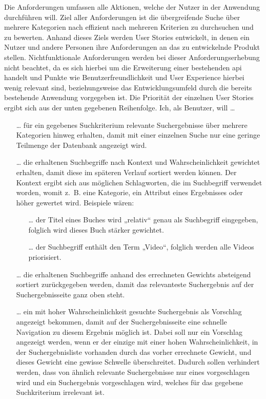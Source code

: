 Die Anforderungen umfassen alle Aktionen, welche der Nutzer in der Anwendung durchführen will. Ziel aller Anforderungen ist die übergreifende Suche über mehrere Kategorien nach effizient nach mehreren Kriterien zu durchsuchen und zu bewerten. Anhand dieses Ziels werden User Stories entwickelt, in denen ein Nutzer und andere Personen ihre Anforderungen an das zu entwickelnde Produkt stellen.
Nichtfunktionale Anforderungen werden bei dieser Anforderungserhebung nicht beachtet, da es sich hierbei um die Erweiterung einer bestehenden \gls{api} handelt und Punkte wie Benutzerfreundlichkeit und User Experience hierbei wenig relevant sind, beziehungsweise das Entwicklungsumfeld durch die bereits bestehende Anwendung vorgegeben ist.
Die Priorität der einzelnen User Stories ergibt sich aus der unten gegebenen Reihenfolge.
Ich, als Benutzer, will …
\begin{itemize}
  \item[…] für ein gegebenes Suchkriterium relevante Suchergebnisse über mehrere Kategorien hinweg erhalten, damit mit einer einzelnen Suche nur eine geringe Teilmenge der Datenbank angezeigt wird.
  \item[…] die erhaltenen Suchbegriffe nach Kontext und Wahrscheinlichkeit gewichtet erhalten, damit diese im späteren Verlauf sortiert werden können. Der Kontext ergibt sich aus möglichen Schlagworten, die im Suchbegriff verwendet worden, womit z. B. eine Kategorie, ein Attribut eines Ergebnisses oder höher gewertet wird. Beispiele wären:
    \begin{itemize}
      \item[…] der Titel eines Buches wird „relativ“ genau als Suchbegriff eingegeben, folglich wird dieses Buch stärker gewichtet.
      \item[…] der Suchbegriff enthält den Term „Video“, folglich werden alle Videos priorisiert.
    \end{itemize}
  \item[…] die erhaltenen Suchbegriffe anhand des errechneten Gewichts absteigend sortiert zurückgegeben werden, damit das relevanteste Suchergebnis auf der Suchergebnisseite ganz oben steht.
  \item[…] ein mit hoher Wahrscheinlichkeit gesuchte Suchergebnis als Vorschlag angezeigt bekommen, damit auf der Suchergebnisseite eine schnelle Navigation zu diesem Ergebnis möglich ist.
    Dabei soll nur ein Vorschlag angezeigt werden, wenn er der einzige mit einer hohen Wahrscheinlichkeit, in der Suchergebnisliste vorhanden durch das vorher errechnete Gewicht, und dieses Gewicht eine gewisse Schwelle überschreitet.
    Dadurch sollen verhindert werden, dass von ähnlich relevante Suchergebnisse nur eines vorgeschlagen wird und ein Suchergebnis vorgeschlagen wird, welches für das gegebene Suchkriterium irrelevant ist.
\end{itemize}
